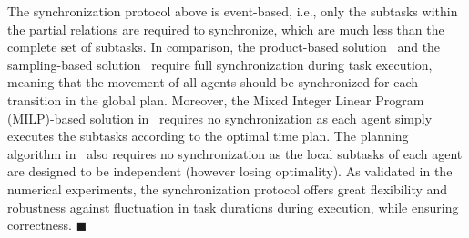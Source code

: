 \begin{remark}\label{remark:syn}
The synchronization protocol above is event-based,
i.e.,  only the subtasks within the partial relations
are required to synchronize,
which are much less than the complete set of subtasks.
In comparison, the product-based solution~\cite{baier2008principles}
and the sampling-based solution~\cite{kantaros2020stylus}
require full synchronization during task execution,
meaning that the movement of all agents should be synchronized for each
transition in the global plan.
Moreover, the Mixed Integer Linear Program (MILP)-based solution
in~\cite{luo2021temporal, jones2019scratchs}
requires no synchronization as each agent simply executes the subtasks
according to the optimal time plan.
The planning algorithm in~\cite{schillinger2018simultaneous}
also requires no synchronization as the local subtasks of each agent
are designed to be independent (however losing optimality).
As validated in the numerical experiments,
the synchronization protocol offers great flexibility
and robustness against fluctuation in task durations during execution,
while ensuring correctness.
\hfill  $\blacksquare$
\end{remark}


